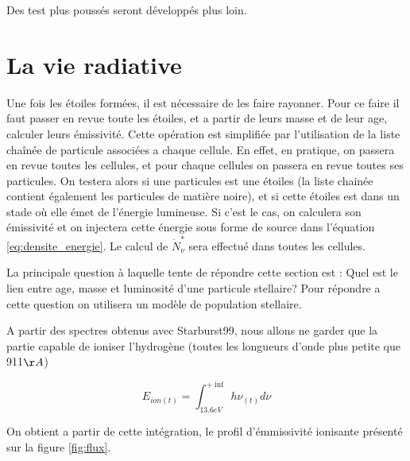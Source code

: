Des test plus poussés seront développés plus loin.



\section{La vie radiative}

Une fois les étoiles formées, il est nécessaire de les faire rayonner.
Pour ce faire il faut passer en revue toute les étoiles, et a partir de leurs masse et de leur age, calculer leurs émissivité.
Cette opération est simplifiée par l'utilisation de la liste chaînée de particule associées a chaque cellule. %
En effet, en pratique, on passera en revue toutes les cellules, et pour chaque cellules on passera en revue toutes ses particules.
On testera alors si une particules est une étoiles (la liste chainée contient également les particules de matière noire), et si cette étoiles est dans un stade où elle émet de l'énergie lumineuse.
Si c'est le cas, on calculera son émissivité et on injectera cette énergie sous forme de source dans l'équation \ref{eq:densite_energie}.
Le calcul de $\dot{N}_\nu^*$ sera effectué dans toutes les cellules.

La principale question à laquelle tente de répondre cette section est : Quel est le lien entre age, masse et luminosité d'une particule stellaire?
Pour répondre a cette question on utilisera un modèle de population stellaire.

A partir des spectres obtenus avec Starburst99, nous allons ne garder que la partie capable de ioniser l'hydrogène (toutes les longueurs d'onde plus petite que 911$\AA$) 

\begin{equation}
E_{ion (t)} = \int_{13.6eV}^{+\inf} h \nu_{(t)} d\nu
\end{equation}

On obtient a partir de cette intégration, le profil d'émmissivité ionisante présenté sur la figure \ref{fig:flux}.

